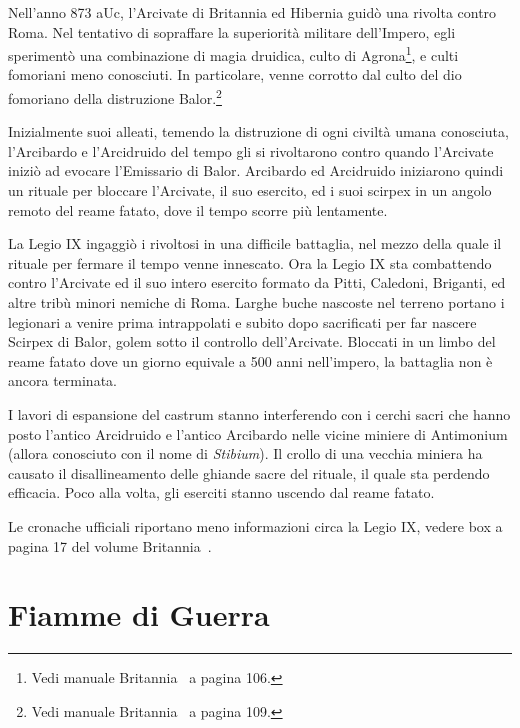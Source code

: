 \documentclass[11.5pt,twocolumn]{article}
\begin{document}
Nell'anno 873 aUc, l'Arcivate di Britannia ed Hibernia guid\`{o} una rivolta contro Roma.
Nel tentativo di sopraffare la superiorit\`{a} militare dell'Impero, egli speriment\`{o} una combinazione di magia druidica, culto di Agrona\footnote{Vedi manuale Britannia~\cite{britannia_en} a pagina 106.}, e culti fomoriani meno conosciuti.
In particolare, venne corrotto dal culto del dio fomoriano della distruzione Balor.\footnote{Vedi manuale Britannia~\cite{britannia_en} a pagina 109.}

Inizialmente suoi alleati, temendo la distruzione di ogni civilt\`{a} umana conosciuta, l'Arcibardo e l'Arcidruido del tempo gli si rivoltarono contro quando l'Arcivate inizi\`{o} ad evocare l'Emissario di Balor.
Arcibardo ed Arcidruido iniziarono quindi un rituale per bloccare l'Arcivate, il suo esercito, ed i suoi scirpex in un angolo remoto del reame fatato, dove il tempo scorre pi\`{u} lentamente.

La Legio IX ingaggi\`{o} i rivoltosi in una difficile battaglia, nel mezzo della quale il rituale per fermare il tempo venne innescato.
Ora la Legio IX sta combattendo contro l'Arcivate ed il suo intero esercito formato da Pitti, Caledoni, Briganti, ed altre trib\`{u} minori nemiche di Roma.
Larghe buche nascoste nel terreno portano i legionari a venire prima intrappolati e subito dopo sacrificati per far nascere Scirpex di Balor, golem sotto il controllo dell'Arcivate.
Bloccati in un limbo del reame fatato dove un giorno equivale a 500 anni nell'impero, la battaglia non \`{e} ancora terminata.

I lavori di espansione del castrum stanno interferendo con i cerchi sacri che hanno posto l'antico Arcidruido e l'antico Arcibardo nelle vicine miniere di Antimonium (allora conosciuto con il nome di \emph{Stibium}).
Il crollo di una vecchia miniera ha causato il disallineamento delle ghiande sacre del rituale, il quale sta perdendo efficacia.
Poco alla volta, gli eserciti stanno uscendo dal reame fatato.

Le cronache ufficiali riportano meno informazioni circa la Legio IX, vedere box a pagina 17 del volume Britannia~\cite{britannia_en}.

\part{Fiamme di Guerra}
\end{document}
